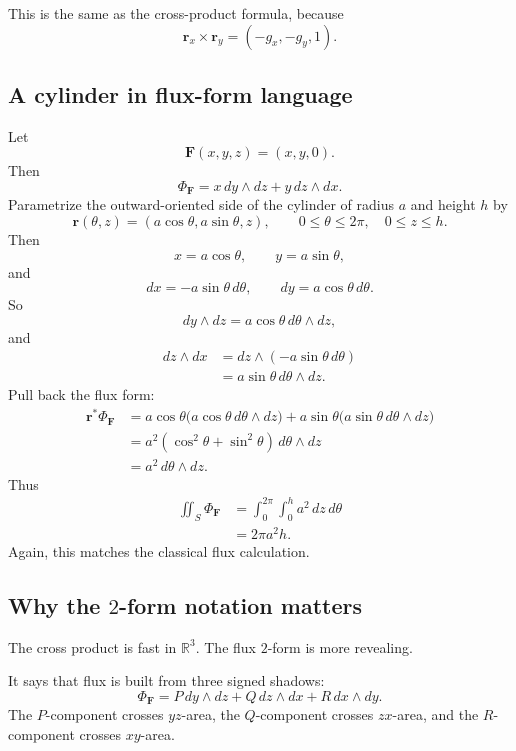 This is the same as the cross-product formula, because
\[
    \mathbf r_x\times\mathbf r_y=(-g_x,-g_y,1).
\]

\subsection{A cylinder in flux-form language}

Let
\[
    \mathbf F(x,y,z)=(x,y,0).
\]
Then
\[
    \Phi_{\mathbf F}
    =
    x\,dy\wedge dz
    +
    y\,dz\wedge dx.
\]
Parametrize the outward-oriented side of the cylinder of radius \(a\) and height \(h\) by
\[
    \mathbf r(\theta,z)=(a\cos\theta,a\sin\theta,z),
    \qquad
    0\le\theta\le2\pi,\quad 0\le z\le h.
\]
Then
\[
    x=a\cos\theta,
    \qquad
    y=a\sin\theta,
\]
and
\[
    dx=-a\sin\theta\,d\theta,
    \qquad
    dy=a\cos\theta\,d\theta.
\]
So
\[
    dy\wedge dz
    =
    a\cos\theta\,d\theta\wedge dz,
\]
and
\[
\begin{aligned}
    dz\wedge dx
    &=
    dz\wedge(-a\sin\theta\,d\theta)\\
    &=
    a\sin\theta\,d\theta\wedge dz.
\end{aligned}
\]
Pull back the flux form:
\[
\begin{aligned}
    \mathbf r^*\Phi_{\mathbf F}
    &=
    a\cos\theta
    \bigl(a\cos\theta\,d\theta\wedge dz\bigr)
    +
    a\sin\theta
    \bigl(a\sin\theta\,d\theta\wedge dz\bigr)\\
    &=
    a^2(\cos^2\theta+\sin^2\theta)\,d\theta\wedge dz\\
    &=
    a^2\,d\theta\wedge dz.
\end{aligned}
\]
Thus
\[
\begin{aligned}
    \iint_S \Phi_{\mathbf F}
    &=
    \int_0^{2\pi}\int_0^h a^2\,dz\,d\theta\\
    &=
    2\pi a^2h.
\end{aligned}
\]
Again, this matches the classical flux calculation.

\subsection{Why the \(2\)-form notation matters}

The cross product is fast in \(\mathbb R^3\).  The flux \(2\)-form is more revealing.

It says that flux is built from three signed shadows:
\[
\boxed{
    \Phi_{\mathbf F}
    =
    P\,dy\wedge dz
    +
    Q\,dz\wedge dx
    +
    R\,dx\wedge dy.
}
\]
The \(P\)-component crosses \(yz\)-area, the \(Q\)-component crosses \(zx\)-area, and
the \(R\)-component crosses \(xy\)-area.

